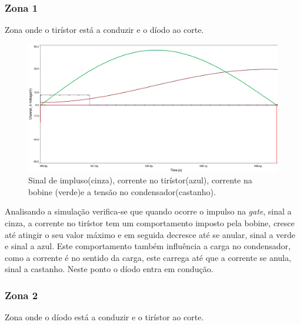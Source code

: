 \documentclass[a4paper,11pt]{article}
\numberwithin{equation}{section}
\begin{document}
\subsubsection*{Zona 1}
	Zona onde o tirístor está a conduzir e o díodo ao corte.
	
	\begin{figure}[h]
		\centering
		\includegraphics[keepaspectratio=true, scale=0.4]{img/Zona1}
		\caption{Sinal de impluso(cinza), corrente no tirístor(azul), corrente na bobine (verde)e a tensão no condensador(castanho).}
		\label{fig:figura 1}
		\vspace{-0.8em}
	\end{figure}
	
	
	Analisando a simulação verifica-se que quando ocorre o impulso na \textit{gate}, sinal a cinza, a corrente no tirístor tem um comportamento imposto pela bobine, cresce até atingir o seu valor máximo e em seguida decresce até se anular, sinal a verde e sinal a azul. Este comportamento também influência a carga no condensador, como a corrente é no sentido da carga, este carrega até que a corrente se anula, sinal a castanho. Neste ponto o díodo entra em condução.
	
	\pagebreak
	   
\subsubsection*{Zona 2}
	Zona onde o díodo está a conduzir e o tirístor ao corte. 
	
\end{document}
